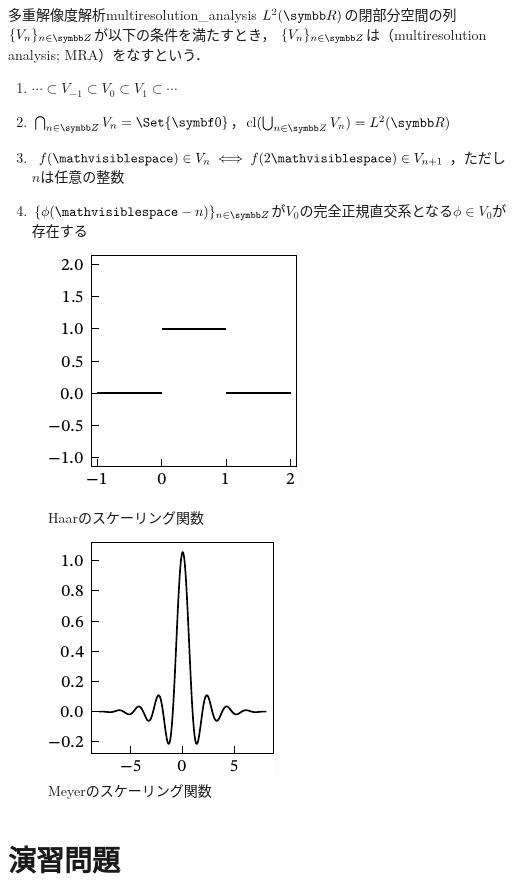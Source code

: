 \documentclass[../../main]{subfiles}
\begin{document}
\begin{definition}{多重解像度解析}{multiresolution_analysis}
  \(\Lebesgue{2}(\numset{R})\)の閉部分空間の列\(\seq{V_n}_{n\in\numset{Z}}\)が以下の条件を満たすとき，
  \(\seq{V_n}_{n\in\numset{Z}}\)は（multiresolution analysis; MRA）をなすという．
  \begin{enumerate}
    \item \(\dotsb\subset V_{-1}\subset V_0\subset V_1\subset\dotsb\)
    \item \(\bigcap_{n\in\numset{Z}}V_n=\Set{\vect{0}}\)，\(\clsr(\bigcup_{n\in\numset{Z}}V_n)=\Lebesgue{2}(\numset{R})\)
    \item \(f(\holder)\in V_n\iff f(2\holder)\in V_{n+1}\)，ただし\(n\)は任意の整数
    \item \(\seq{\phi(\holder-n)}_{n\in\numset{Z}}\)が\(V_0\)の完全正規直交系となる\(\phi\in V_0\)が存在する
  \end{enumerate}
\end{definition}

\begin{figure}[htbp]
  \begin{minipage}{0.5\linewidth}
    \centering
    \includegraphics{haar_scaling}
    \caption{Haarのスケーリング関数}
  \end{minipage}%
  \begin{minipage}{0.5\linewidth}
    \centering
    \includegraphics{meyer_scaling}
    \caption{Meyerのスケーリング関数}
  \end{minipage}
\end{figure}

\section*{演習問題}
\end{document}
